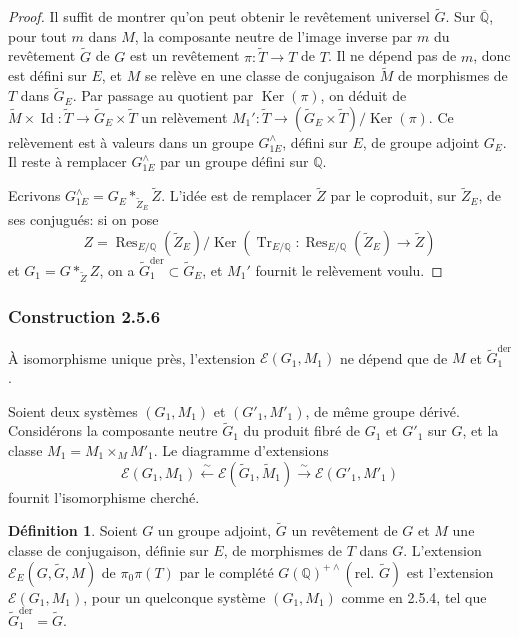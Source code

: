 \documentclass[12pt,a4paper]{article}
\theoremstyle{plain}
\theoremstyle{definition}
\newtheorem{definition}[theorem]{D\'efinition}
\theoremstyle{remark}
\DeclareMathOperator{\Ker}{Ker}
\DeclareMathOperator{\Res}{Res}
\DeclareMathOperator{\Tr}{Tr}
\DeclareMathOperator{\Id}{Id}
\newcommand{\QQ}{\mathbb{Q}}
\begin{document}
\begin{proof}
Il suffit de montrer qu'on peut obtenir le rev\^etement universel $\tilde{G}$. Sur $\overline{\QQ}$, pour tout $m$ dans $M$, la composante neutre de l'image inverse par $m$ du rev\^etement $\tilde{G}$ de $G$ est un rev\^etement $\pi: \tilde{T} \to T$ de $T$. Il ne d\'epend pas de $m$, donc est d\'efini sur $E$, et $M$ se rel\`eve en une classe de conjugaison $\tilde{M}$ de morphismes de $T$ dans $\tilde{G}_E$. Par passage au quotient par $\Ker(\pi)$, on d\'eduit de $\tilde{M} \times \Id: \tilde{T} \to \tilde{G}_E \times \tilde{T}$ un rel\`evement $M_1': \tilde{T} \to (\tilde{G}_E \times \tilde{T})/\Ker(\pi)$. Ce rel\`evement est \`a valeurs dans un groupe $G_{1E}^{\wedge}$, d\'efini sur $E$, de groupe adjoint $G_E$. Il reste \`a remplacer $G_{1E}^{\wedge}$ par un groupe d\'efini sur $\QQ$.

Ecrivons $G_{1E}^{\wedge} = G_E *_{\tilde{Z}_E} \tilde{Z}$. L'id\'ee est de remplacer $\tilde{Z}$ par le coproduit, sur $\tilde{Z}_E$, de ses conjugu\'es: si on pose
\[
Z = \Res_{E/\QQ}(\tilde{Z}_E)/\Ker(\Tr_{E/\QQ}: \Res_{E/\QQ}(\tilde{Z}_E) \to \tilde{Z})
\]
et $G_1 = G *_{\tilde{Z}} Z$, on a $\tilde{G}_1^{\text{der}} \subset \tilde{G}_E$, et $M_1'$ fournit le rel\`evement voulu.
\end{proof}

\subsubsection*{Construction 2.5.6}

\`A isomorphisme unique pr\`es, l'extension $\mathscr{E}(G_1,M_1)$ ne d\'epend que de $M$ et $\tilde{G}_1^{\text{der}}$.

Soient deux syst\`emes $(G_1,M_1)$ et $(G'_1,M'_1)$, de m\^eme groupe d\'eriv\'e. Consid\'erons la composante neutre $\tilde{G}_1$ du produit fibr\'e de $G_1$ et $G'_1$ sur $G$, et la classe $M_1 = M_1 \times_M M'_1$. Le diagramme d'extensions
\[
\mathscr{E}(G_1,M_1) \xleftarrow{\sim} \mathscr{E}(\tilde{G}_1,\tilde{M}_1) \xrightarrow{\sim} \mathscr{E}(G'_1,M'_1)
\]
fournit l'isomorphisme cherch\'e.

\begin{definition}
Soient $G$ un groupe adjoint, $\tilde{G}$ un rev\^etement de $G$ et $M$ une classe de conjugaison, d\'efinie sur $E$, de morphismes de $T$ dans $G$. L'extension $\mathscr{E}_E(G,\tilde{G},M)$ de $\pi_0\pi(T)$ par le compl\'et\'e $G(\QQ)^{+\wedge}(\text{rel.~}\tilde{G})$ est l'extension $\mathscr{E}(G_1,M_1)$, pour un quelconque syst\`eme $(G_1,M_1)$ comme en 2.5.4, tel que $\tilde{G}_1^{\text{der}} = \tilde{G}$.
\end{definition}
\end{document}
